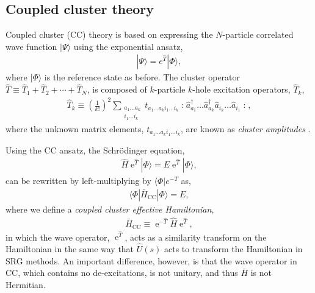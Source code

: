 \documentclass[aip, jcp, 12pt]{revtex4-1}
\newcommand{\E}{\operatorname{e}}
\newcommand{\bra}[1]{\langle #1 |}
\newcommand{\ket}[1]{| #1 \rangle}
\newcommand{\normord}[1]{\mathopen: #1 \mathclose:}
\begin{document}
\subsection{Coupled cluster theory}
\label{subsec:cctheory}

Coupled cluster (CC) theory is based on expressing the $N$-particle correlated wave function $\ket{\Psi}$ using the exponential ansatz,
\begin{align*}
  \ket{\Psi} = e^{\hat{T}} \ket{\Phi},
\end{align*}
where $\ket{\Phi}$ is the reference state as before.  The cluster operator $\hat{T} \equiv \hat{T}_1 + \hat{T}_2 + \cdots + \hat{T}_N$, is composed of $k$-particle $k$-hole excitation operators, $\hat{T}_k$,
\begin{align} \label{eq:cc_amps}
  \hat{T}_k \equiv \left(\frac{1}{k!}\right)^2 \sum_{\substack{a_1 \ldots a_k \\ i_1 \ldots i_k}} t_{a_1 \ldots a_k i_1 \ldots i_k} \normord{\hat{a}_{a_1}^\dagger \ldots \hat{a}_{a_k}^\dagger \hat a_{i_k}^{} \ldots \hat{a}_{i_1}^{}},
\end{align}
where the unknown matrix elements, $t_{a_1 \ldots a_k i_1 \ldots i_k}$, are known as \textit{cluster amplitudes} \cite{shavitt2009many}.

Using the CC ansatz, the Schr\"odinger equation,
\begin{align} \label{eq:cc_schrodeq}
  \hat{H} \E^{\hat{T}} \ket{\Phi} = E \E^{\hat{T}} \ket{\Phi},
\end{align}
can be rewritten by left-multiplying by $\bra{\Phi}e^{-T}$ as,
\begin{align*}
  \bra{\Phi} \bar{H}_{\mathrm{CC}} \ket{\Phi} = E,
\end{align*}
where we define a \textit{coupled cluster effective Hamiltonian},
\begin{align} \label{eq:cc_heff0}
  \bar{H}_{\mathrm{CC}} \equiv \E^{-\hat{T}} \hat{H} \E^{\hat{T}},
\end{align}
in which the wave operator, $\E^{\hat{T}}$, acts as a similarity transform on the Hamiltonian in the same way that $\hat{U}(s)$ acts to transform the Hamiltonian in SRG methods.  An important difference, however, is that the wave operator in CC, which contains no de-excitations, is not unitary, and thus $\bar{H}$ is not Hermitian.
\end{document}
